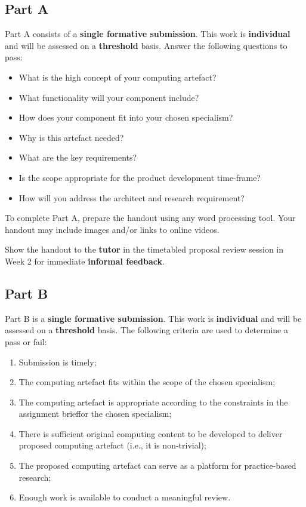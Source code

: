 \documentclass{../../fal_assignment}
\begin{document}
\subsection*{Part A}

Part A consists of a \textbf{single formative submission}. This work is \textbf{individual} and will be assessed on a \textbf{threshold} basis. Answer the following questions to pass:

\begin{itemize}
	\item What is the high concept of your computing artefact?
	\item What functionality will your component include?
	\item How does your component fit into your chosen specialism?
	\item Why is this artefact needed?
	\item What are the key requirements?
	\item Is the scope appropriate for the product development time-frame?
	\item How will you address the architect and research requirement?
\end{itemize}

To complete Part A, prepare the handout using any word processing tool.
Your handout may include images and/or links to online videos.

Show the handout to the \textbf{tutor} in the timetabled proposal review session in Week 2 for immediate \textbf{informal feedback}.

\subsection*{Part B}

Part B is a \textbf{single formative submission}. This work is \textbf{individual} and will be assessed on a \textbf{threshold} basis. The following criteria are used to determine a pass or fail:

\begin{enumerate}[label=(\alph*)]
	\item Submission is timely;
	\item The computing artefact fits within the scope of the chosen specialism;
	\item The computing artefact is appropriate according to the constraints in the assignment brieffor the chosen specialism;
	\item There is sufficient original computing content to be developed to deliver proposed computing artefact (i.e., it is non-trivial);
	\item The proposed computing artefact can serve as a platform for practice-based research;
	\item Enough work is available to conduct a meaningful review.
\end{enumerate}
\end{document}
